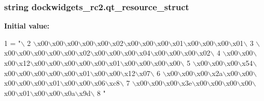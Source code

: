 \hypertarget{namespacedockwidgets__rc2_a73b8767a790d45ebcd685288cb89b23f}{}
\subsubsection[{qt\+\_\+resource\+\_\+struct}]{\setlength{\rightskip}{0pt plus 5cm}string dockwidgets\+\_\+rc2.\+qt\+\_\+resource\+\_\+struct}\label{namespacedockwidgets__rc2_a73b8767a790d45ebcd685288cb89b23f}
{\bfseries Initial value\+:}
\begin{DoxyCode}
1 = \textcolor{stringliteral}{"\(\backslash\)}
2 \textcolor{stringliteral}{\(\backslash\)x00\(\backslash\)x00\(\backslash\)x00\(\backslash\)x00\(\backslash\)x00\(\backslash\)x02\(\backslash\)x00\(\backslash\)x00\(\backslash\)x00\(\backslash\)x01\(\backslash\)x00\(\backslash\)x00\(\backslash\)x00\(\backslash\)x01\(\backslash\)}
3 \textcolor{stringliteral}{\(\backslash\)x00\(\backslash\)x00\(\backslash\)x00\(\backslash\)x00\(\backslash\)x00\(\backslash\)x02\(\backslash\)x00\(\backslash\)x00\(\backslash\)x00\(\backslash\)x04\(\backslash\)x00\(\backslash\)x00\(\backslash\)x00\(\backslash\)x02\(\backslash\)}
4 \textcolor{stringliteral}{\(\backslash\)x00\(\backslash\)x00\(\backslash\)x00\(\backslash\)x12\(\backslash\)x00\(\backslash\)x00\(\backslash\)x00\(\backslash\)x00\(\backslash\)x00\(\backslash\)x01\(\backslash\)x00\(\backslash\)x00\(\backslash\)x00\(\backslash\)x00\(\backslash\)}
5 \textcolor{stringliteral}{\(\backslash\)x00\(\backslash\)x00\(\backslash\)x00\(\backslash\)x54\(\backslash\)x00\(\backslash\)x00\(\backslash\)x00\(\backslash\)x00\(\backslash\)x00\(\backslash\)x01\(\backslash\)x00\(\backslash\)x00\(\backslash\)x12\(\backslash\)x07\(\backslash\)}
6 \textcolor{stringliteral}{\(\backslash\)x00\(\backslash\)x00\(\backslash\)x00\(\backslash\)x2a\(\backslash\)x00\(\backslash\)x00\(\backslash\)x00\(\backslash\)x00\(\backslash\)x00\(\backslash\)x01\(\backslash\)x00\(\backslash\)x00\(\backslash\)x06\(\backslash\)xc8\(\backslash\)}
7 \textcolor{stringliteral}{\(\backslash\)x00\(\backslash\)x00\(\backslash\)x00\(\backslash\)x3e\(\backslash\)x00\(\backslash\)x00\(\backslash\)x00\(\backslash\)x00\(\backslash\)x00\(\backslash\)x01\(\backslash\)x00\(\backslash\)x00\(\backslash\)x0a\(\backslash\)x9d\(\backslash\)}
8 \textcolor{stringliteral}{"}
\end{DoxyCode}
